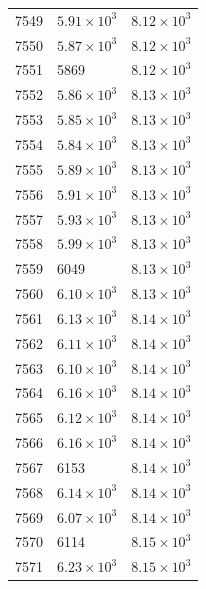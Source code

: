 \begin{table}[H]
\begin{tabular}{lll}
7549 & $\displaystyle 5.91 \times 10^{3}$ & $\displaystyle 8.12 \times 10^{3}$ \\
7550 & $\displaystyle 5.87 \times 10^{3}$ & $\displaystyle 8.12 \times 10^{3}$ \\
7551 & 5869 & $\displaystyle 8.12 \times 10^{3}$ \\
7552 & $\displaystyle 5.86 \times 10^{3}$ & $\displaystyle 8.13 \times 10^{3}$ \\
7553 & $\displaystyle 5.85 \times 10^{3}$ & $\displaystyle 8.13 \times 10^{3}$ \\
7554 & $\displaystyle 5.84 \times 10^{3}$ & $\displaystyle 8.13 \times 10^{3}$ \\
7555 & $\displaystyle 5.89 \times 10^{3}$ & $\displaystyle 8.13 \times 10^{3}$ \\
7556 & $\displaystyle 5.91 \times 10^{3}$ & $\displaystyle 8.13 \times 10^{3}$ \\
7557 & $\displaystyle 5.93 \times 10^{3}$ & $\displaystyle 8.13 \times 10^{3}$ \\
7558 & $\displaystyle 5.99 \times 10^{3}$ & $\displaystyle 8.13 \times 10^{3}$ \\
7559 & 6049 & $\displaystyle 8.13 \times 10^{3}$ \\
7560 & $\displaystyle 6.10 \times 10^{3}$ & $\displaystyle 8.13 \times 10^{3}$ \\
7561 & $\displaystyle 6.13 \times 10^{3}$ & $\displaystyle 8.14 \times 10^{3}$ \\
7562 & $\displaystyle 6.11 \times 10^{3}$ & $\displaystyle 8.14 \times 10^{3}$ \\
7563 & $\displaystyle 6.10 \times 10^{3}$ & $\displaystyle 8.14 \times 10^{3}$ \\
7564 & $\displaystyle 6.16 \times 10^{3}$ & $\displaystyle 8.14 \times 10^{3}$ \\
7565 & $\displaystyle 6.12 \times 10^{3}$ & $\displaystyle 8.14 \times 10^{3}$ \\
7566 & $\displaystyle 6.16 \times 10^{3}$ & $\displaystyle 8.14 \times 10^{3}$ \\
7567 & 6153 & $\displaystyle 8.14 \times 10^{3}$ \\
7568 & $\displaystyle 6.14 \times 10^{3}$ & $\displaystyle 8.14 \times 10^{3}$ \\
7569 & $\displaystyle 6.07 \times 10^{3}$ & $\displaystyle 8.14 \times 10^{3}$ \\
7570 & 6114 & $\displaystyle 8.15 \times 10^{3}$ \\
7571 & $\displaystyle 6.23 \times 10^{3}$ & $\displaystyle 8.15 \times 10^{3}$ \\

\end{tabular}
\end{table}
